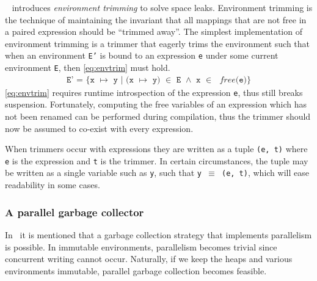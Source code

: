 ~\cite{sestoft1997deriving} introduces \textit{environment trimming} to solve space leaks.
Environment trimming is the technique of maintaining the invariant that all mappings that are not free in a paired expression should be ``trimmed away''.
The simplest implementation of environment trimming is a trimmer that eagerly trims the environment such that when an environment \texttt{E'} is bound to an expression \texttt{e} under some current environment \texttt{E}, then \autoref{eq:envtrim} must hold.
\begin{align}
  \texttt{E' = \{x $\mapsto$ y | (x $\mapsto$ y) $\in$ E $\land$ x $\in$ }\textit{free}\texttt{(e)\}}\label{eq:envtrim}
\end{align}
\autoref{eq:envtrim} requires runtime introspection of the expression \texttt{e}, thus still breaks suspension.
Fortunately, computing the free variables of an expression which has not been renamed can be performed during compilation, thus the trimmer should now be assumed to co-exist with every expression.
\begin{remark}
  When trimmers occur with expressions they are written as a tuple \texttt{(e, t)} where \texttt{e} is the expression and \texttt{t} is the trimmer.
  In certain circumstances, the tuple may be written as a single variable such as \texttt{y}, such that \texttt{y $\equiv$ (e, t)}, which will ease readability in some cases.
\end{remark}

\subsubsection{A parallel garbage collector}\label{sec:pargc}
In~\cite{launchbury1993natural} it is mentioned that a garbage collection strategy that implements parallelism is possible.
In immutable environments, parallelism becomes trivial since concurrent writing cannot occur.
Naturally, if we keep the heaps and various environments immutable, parallel garbage collection becomes feasible.


